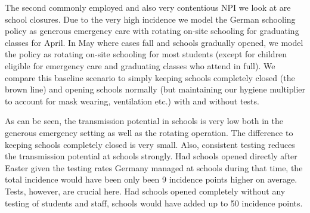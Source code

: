 \FloatBarrier

The second commonly employed and also very contentious NPI we look at are school
closures. Due to the very high incidence we model the German schooling policy as
generous emergency care with rotating on-site schooling for graduating classes for April.
In May where cases fall and schools gradually opened, we model the policy as
rotating on-site schooling for most students (except for children eligible for emergency
care and graduating classes who attend in full). We compare this baseline scenario to
simply keeping schools completely closed (the brown line) and opening schools normally
(but maintaining our hygiene multiplier to account for mask wearing, ventilation etc.)
with and without tests.

As can be seen, the transmission potential in schools is very low both in the generous
emergency setting as well as the rotating operation. The difference to keeping schools
completely closed is very small. Also, consistent testing reduces the transmission
potential at schools strongly. Had schools opened directly after Easter given the testing
rates Germany managed at schools during that time, the total incidence would have been
only been 9 incidence points higher on average. Tests, however, are crucial here. Had
schools opened completely without any testing of students and staff, schools would have
added up to 50 incidence points.

